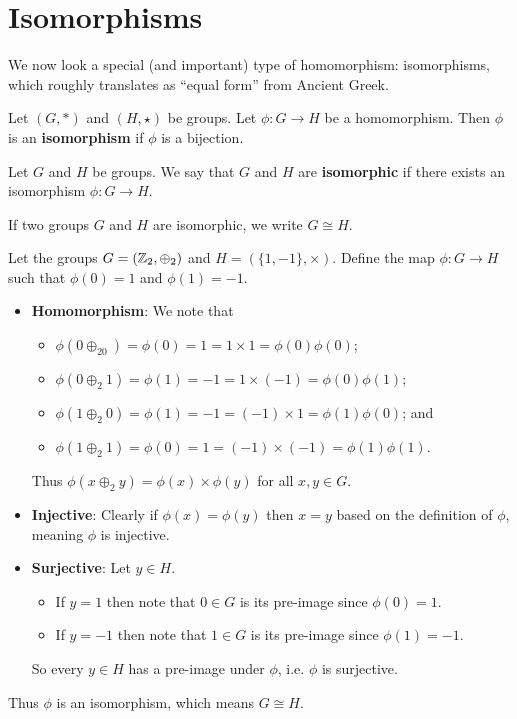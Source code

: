 \section{Isomorphisms}
We now look a special (and important) type of homomorphism: isomorphisms, which roughly translates as ``equal form'' from Ancient Greek.

\begin{definition}
    Let $(G, \ast)$ and $(H, \star)$ be groups. Let $\phi: G \to H$ be a homomorphism. Then $\phi$ is an \textbf{isomorphism} if $\phi$ is a bijection.
\end{definition}
\begin{definition}
    Let $G$ and $H$ be groups. We say that $G$ and $H$ are \textbf{isomorphic} if there exists an isomorphism $\phi: G \to H$.

    If two groups $G$ and $H$ are isomorphic, we write $G \cong H$.
\end{definition}

\begin{example}
    Let the groups $G = (\mathbb{Z}_2, \oplus_2)$ and $H = (\{1, -1\}, \times)$. Define the map $\phi: G \to H$ such that $\phi(0) = 1$ and $\phi(1) = -1$.

    \begin{itemize}
        \item \textbf{Homomorphism}: We note that
        \begin{itemize}
            \item $\phi(0\oplus_20) = \phi(0) = 1 = 1 \times 1 = \phi(0)\phi(0)$;
            \item $\phi(0 \oplus_2 1) = \phi(1) = -1 = 1 \times (-1) = \phi(0)\phi(1)$;
            \item $\phi(1 \oplus_2 0) = \phi(1) = -1 = (-1) \times 1 = \phi(1)\phi(0)$; and
            \item $\phi(1 \oplus_2 1) = \phi(0) = 1 = (-1) \times (-1) = \phi(1)\phi(1)$.
        \end{itemize}
        Thus $\phi(x\oplus_2y) = \phi(x)\times\phi(y)$ for all $x, y \in G$.

        \item \textbf{Injective}: Clearly if $\phi(x) = \phi(y)$ then $x = y$ based on the definition of $\phi$, meaning $\phi$ is injective.

        \item \textbf{Surjective}: Let $y \in H$.
        \begin{itemize}
            \item If $y = 1$ then note that $0 \in G$ is its pre-image since $\phi(0) = 1$.
            \item If $y = -1$ then note that $1 \in G$ is its pre-image since $\phi(1) = -1$.
        \end{itemize}
        So every $y \in H$ has a pre-image under $\phi$, i.e. $\phi$ is surjective.
    \end{itemize}
    Thus $\phi$ is an isomorphism, which means $G \cong H$.
\end{example}


